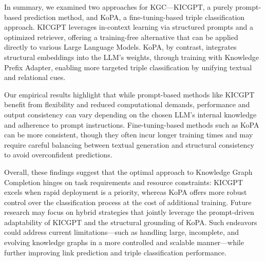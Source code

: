 \documentclass[12pt,a4paper]{article}
\begin{document}
In summary, we examined two approaches for KGC—KICGPT, a purely prompt-based prediction method, and KoPA, a fine-tuning-based triple classification approach.
KICGPT leverages in-context learning via structured prompts and a optimized retriever, offering a training-free alternative that can be applied directly to various Large Language Models.
KoPA, by contrast, integrates structural embeddings into the LLM's weights, through training with Knowledge Prefix Adapter, enabling more targeted triple classification by unifying textual and relational cues.

Our empirical results highlight that while prompt-based methods like KICGPT benefit from flexibility and reduced computational demands, performance and output consistency can vary depending on the chosen LLM's internal knowledge and adherence to prompt instructions.
Fine-tuning-based methods such as KoPA can be more consistent, though they often incur longer training times and may require careful balancing between textual generation and structural consistency to avoid overconfident predictions.

Overall, these findings suggest that the optimal approach to Knowledge Graph Completion hinges on task requirements and resource constraints: KICGPT excels when rapid deployment is a priority, whereas KoPA offers more robust control over the classification process at the cost of additional training.
Future research may focus on hybrid strategies that jointly leverage the prompt-driven adaptability of KICGPT and the structural grounding of KoPA. Such endeavors could address current limitations—such as handling large, incomplete, and evolving knowledge graphs in a more controlled and scalable manner—while further improving link prediction and triple classification performance.


\end{document}
